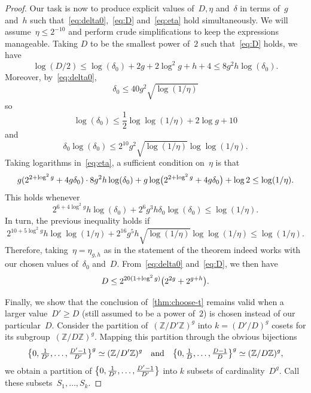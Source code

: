 \documentclass[12pt,oneside]{amsart}
\numberwithin{equation}{section}
\theoremstyle{definition}
\newcommand{\Z}{\mathbb{Z}}
\DeclarePairedDelimiter{\paren}{(}{)}
\DeclarePairedDelimiter{\set}{\{}{\}}
\begin{document}
\begin{proof}
  Our task is now to produce explicit values of~$D,\eta$ and~$\delta$ in terms
  of~$g$ and~$h$ such that~\eqref{eq:delta0},~\eqref{eq:D} and~\eqref{eq:eta}
  hold simultaneously. We will assume~$\eta\leq 2^{-10}$ and perform crude
  simplifications to keep the expressions manageable. Taking $D$ to be the
  smallest power of~$2$ such that~\eqref{eq:D} holds, we have
  \begin{displaymath}
    \log(D/2) \leq \log(\delta_0) + 2g + 2\log^2 g + h + 4 \leq 8g^2 h \log(\delta_0).
  \end{displaymath}
  Moreover, by~\eqref{eq:delta0},
  \begin{displaymath}
    \delta_0\leq 40 g^2 \sqrt{\log(1/\eta)}
  \end{displaymath}
  so
  \begin{displaymath}
    \log(\delta_0)\leq \frac 12 \log\log(1/\eta) + 2\log g + 10
  \end{displaymath}
  and
  \begin{displaymath}
    \delta_0\log(\delta_0)\leq 2^{10}g^2 \sqrt{\log(1/\eta)} \log\log(1/\eta).
  \end{displaymath}
  Taking logarithms in~\eqref{eq:eta}, a sufficient condition on~$\eta$ is that
  \begin{displaymath}
    g(2^{2+\log^2 g} + 4g\delta_0)  \cdot 8g^2h\log(\delta_0)
    +g \log\paren[\big]{2^{2+\log^2 g} + 4g\delta_0} + \log 2 \leq \log(1/\eta).
  \end{displaymath}
  This holds whenever
  \begin{displaymath}
    2^{6 + 4\log^2 g} h\log(\delta_0) + 2^6g^3h\delta_0 \log(\delta_0) \leq \log(1/\eta).
  \end{displaymath}
  In turn, the previous inequality holds if
  \begin{displaymath}
    2^{10 + 5\log^2 g}h\log\log(1/\eta) + 2^{16}g^5 h\sqrt{\log(1/\eta)} \log\log(1/\eta) \leq \log (1/\eta).
  \end{displaymath}
  Therefore, taking~$\eta = \eta_{g,h}$ as in the statement of the theorem
  indeed works with our chosen values of~$\delta_0$
  and~$D$. From~\eqref{eq:delta0} and~\eqref{eq:D}, we then have
  \begin{displaymath}
    D\leq 2^{20(1+\log^2 g)}\paren[\big]{2^{2g} + 2^{g+h}}.
  \end{displaymath}

  Finally, we show that the conclusion of~\cref{thm:choose-t} remains valid
  when a larger value~$D'\geq D$ (still assumed to be a power of~$2$) is chosen
  instead of our particular~$D$. Consider the partition of~$(\Z/D'\Z)^g$ into
  $k = (D'/D)^g$ cosets for its subgroup~$(\Z/D\Z)^g$. Mapping this partition
  through the obvious bijections
  \begin{displaymath}
    \set[\big]{0,\tfrac{1}{D'},\ldots,\tfrac{D'-1}{D'}}^g \simeq (\Z/D'\Z)^g \quad\text{and}\quad
     \set[\big]{0,\tfrac{1}{D},\ldots,\tfrac{D-1}{D}}^g \simeq (\Z/D\Z)^g,
  \end{displaymath}
  we obtain a partition of
  $\set[\big]{0,\tfrac{1}{D'},\ldots,\tfrac{D'-1}{D'}}$ into $k$ subsets of
  cardinality~$D^g$. Call these subsets~$S_1,\ldots,S_k$.


\end{proof}
\end{document}
